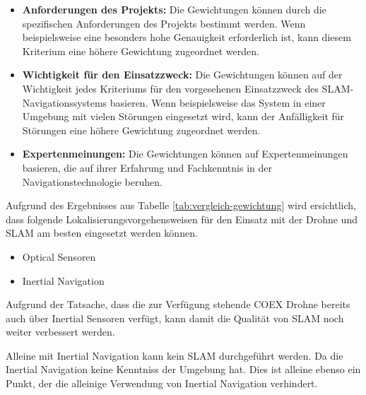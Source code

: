 \begin{itemize}
\item \textbf{Anforderungen des Projekts:} Die Gewichtungen können durch die spezifischen Anforderungen des Projekts bestimmt werden. Wenn beispielsweise eine besonders hohe Genauigkeit erforderlich ist, kann diesem Kriterium eine höhere Gewichtung zugeordnet werden.

\item \textbf{Wichtigkeit für den Einsatzzweck:} Die Gewichtungen können auf der Wichtigkeit jedes Kriteriums für den vorgesehenen Einsatzzweck des \ac{SLAM}-Navigationssystems basieren. Wenn beispielsweise das System in einer Umgebung mit vielen Störungen eingesetzt wird, kann der Anfälligkeit für Störungen eine höhere Gewichtung zugeordnet werden.
\item \textbf{Expertenmeinungen:} Die Gewichtungen können auf Expertenmeinungen basieren, die auf ihrer Erfahrung und Fachkenntnis in der Navigationstechnologie beruhen.
\end{itemize}

Aufgrund des Ergebnisses aus Tabelle \ref{tab:vergleich-gewichtung} wird ersichtlich, dass folgende Lokalisierungsvorgehensweisen für den Einsatz mit der Drohne und \ac{SLAM} am besten eingesetzt werden können.

\begin{itemize}
    \item Optical Sensoren
    \item Inertial Navigation
\end{itemize}

Aufgrund der Tatsache, dass die zur Verfügung stehende COEX Drohne bereits auch über Inertial Sensoren verfügt, kann damit die Qualität von \ac{SLAM} noch weiter verbessert werden.

Alleine mit Inertial Navigation kann kein \ac{SLAM} durchgeführt werden. Da die Inertial Navigation keine Kenntniss der Umgebung hat. Dies ist alleine ebenso ein Punkt, der die alleinige Verwendung von Inertial Navigation verhindert.

